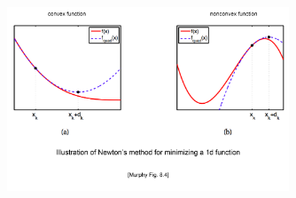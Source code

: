 \documentclass[a4paper]{article}
\begin{document}
\begin{figure}
\centering
\includegraphics[width=0.75\textwidth]{murphy_fig8_4.png}
\end{figure}
\end{document}
